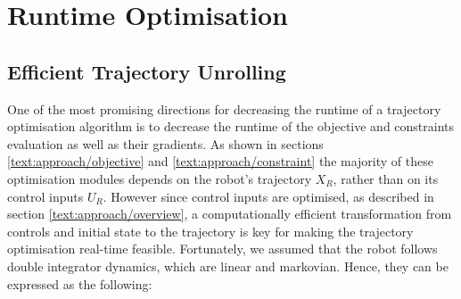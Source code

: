 

\section{Runtime Optimisation}
\label{text:approach/runtime}

\subsection{Efficient Trajectory Unrolling}
\label{text:approach/runtime/unrolling}
One of the most promising directions for decreasing the runtime of a trajectory optimisation algorithm is to decrease the runtime of the objective and constraints evaluation as well as their gradients. As shown in sections \ref{text:approach/objective} and \ref{text:approach/constraint} the majority of these optimisation modules depends on the robot's trajectory $X_R$, rather than on its control inputs $U_R$. However since control inputs are optimised, as described in section \ref{text:approach/overview}, a computationally efficient transformation from controls and initial state to the trajectory is key for making the trajectory optimisation real-time feasible.
\newline
Fortunately, we assumed that the robot follows double integrator dynamics, which are linear and markovian. Hence, they can be expressed as the following: 

